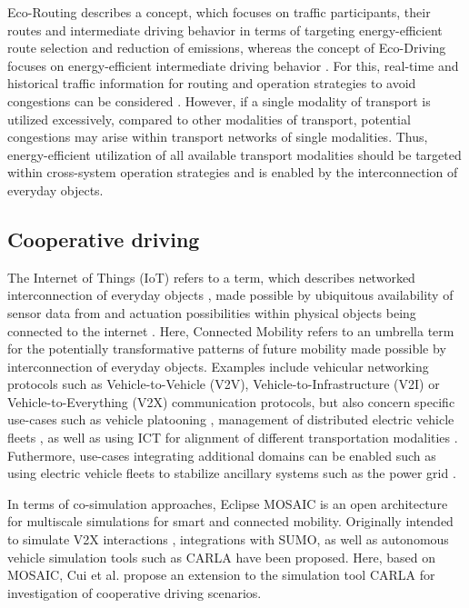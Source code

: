 \documentclass[a4paper,twoside]{article}
\begin{document}
Eco-Routing describes a concept, which focuses on traffic participants, their routes and intermediate driving behavior in terms of targeting energy-efficient route selection and reduction of emissions, whereas the concept of Eco-Driving focuses on energy-efficient intermediate driving behavior \cite{ericsson2006optimizing,Boriboonsomsin2012}. For this, real-time and historical traffic information for routing and operation strategies to avoid congestions can be considered \cite{Boriboonsomsin2012}. However, if a single modality of transport is utilized excessively, compared to other modalities of transport, potential congestions may arise within transport networks of single modalities. Thus, energy-efficient utilization of all available transport modalities should be targeted within cross-system operation strategies and is enabled by the interconnection of everyday objects. 

	\subsection{Cooperative driving}
\label{sec:cooperative-driving}

	
	 The Internet of Things (IoT) refers to a term, which describes networked interconnection of everyday objects \cite{xia2012internet}, made possible by ubiquitous availability of sensor data from and actuation possibilities within physical objects being connected to the internet \cite{kopetz2011internet}. Here, Connected Mobility refers to an umbrella term for the potentially transformative patterns of future mobility made possible by interconnection of everyday objects. Examples include vehicular networking protocols such as Vehicle-to-Vehicle (V2V), Vehicle-to-Infrastructure (V2I) or Vehicle-to-Everything (V2X) communication protocols, but also concern specific use-cases such as vehicle platooning \cite{jia2015survey}, management of distributed electric vehicle fleets \cite{hu2016electric}, as well as using ICT for alignment of different transportation modalities \cite{harris2015ict}. Futhermore, use-cases integrating additional domains can be enabled such as using electric vehicle fleets to stabilize ancillary systems such as the power grid \cite{tomic2007using}.
	
	 In terms of co-simulation approaches, Eclipse MOSAIC \cite{noauthor_eclipse_nodate} is an open architecture for multiscale simulations for smart and connected mobility. Originally intended to simulate V2X interactions \cite{schunemann_v2x_2011}, integrations with SUMO, as well as autonomous vehicle simulation tools such as CARLA \cite{dosovitskiy_carla_2017} have been proposed. Here, based on MOSAIC, Cui et al. \cite{cui_extensible_2023} propose an extension to the simulation tool CARLA for investigation of cooperative driving scenarios. 
	
\end{document}
